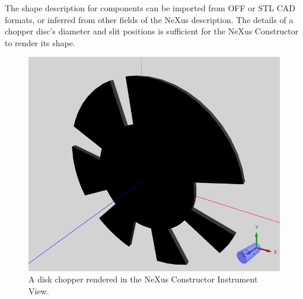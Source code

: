 The shape description for components can be imported from OFF or STL CAD formats, or inferred from other fields of the NeXus description.
The details of a chopper disc's diameter and slit positions is sufficient for the NeXus Constructor to render its shape.

\begin{figure}
	\includegraphics[width=0.6\linewidth]{chopperinstrumentview.png}
	\caption{A disk chopper rendered in the NeXus Constructor Instrument View.}
\end{figure}

